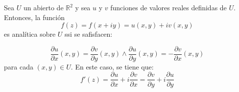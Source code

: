 \begin{teorema}
    Sea $U$ un abierto de $\mathbb{R}^2$ y sea $u$ y $v$ funciones de valores reales definidas de $U$. Entonces, la función 
    $$f(z)=f(x+iy)=u(x,y)+iv(x,y)$$
    es analítica sobre $U$ ssi se safisfacen:
    
    $$\frac{\partial u }{\partial x}(x,y)=\frac{\partial v}{\partial y}(x,y)\wedge\frac{\partial u }{\partial y}(x,y)=-\frac{\partial v}{\partial x}(x,y) $$
    para cada $(x,y)\in U$. En este caso, se tiene que: $$f'(z)=\frac{\partial u}{\partial x}+i\frac{\partial v}{\partial x}= \frac{\partial v}{\partial y}+i\frac{\partial u}{\partial y}$$
\end{teorema}